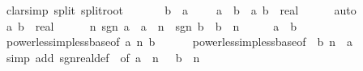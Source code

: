 \begin{isabellebody}
%
\isadelimproof
%
\endisadelimproof
%
\isatagproof
{}\isamarkupfalse%
\ {\isacharparenleft}{\kern0pt}clarsimp\ split{\isacharcolon}{\kern0pt}\ split{\isacharunderscore}{\kern0pt}root{\isacharparenright}{\kern0pt}\isanewline
\ \ \isamarkupfalse%
\ {\isacharasterisk}{\kern0pt}{\isacharcolon}{\kern0pt}\ {\isachardoublequoteopen}{}\ {\isacharless}{\kern0pt}\ b\ {\isasymLongrightarrow}\ a\ {\isacharless}{\kern0pt}\ {}\ {\isasymLongrightarrow}\ {\isasymnot}\ a\ {\isachargreater}{\kern0pt}\ b{\isachardoublequoteclose}\ \ a\ b\ {\isacharcolon}{\kern0pt}{\isacharcolon}{\kern0pt}\ real\isanewline
\ \ \ \ \isamarkupfalse%
\ auto\isanewline
\ \ \isamarkupfalse%
\ a\ b\ {\isacharcolon}{\kern0pt}{\isacharcolon}{\kern0pt}\ real\isanewline
\ \ \isamarkupfalse%
\ {\isachardoublequoteopen}{}\ {\isacharless}{\kern0pt}\ n{\isachardoublequoteclose}\ {\isachardoublequoteopen}sgn\ a\ {\isacharasterisk}{\kern0pt}\ {\isasymbar}a{\isasymbar}\ {\isacharcircum}{\kern0pt}\ n\ {\isacharless}{\kern0pt}\ sgn\ b\ {\isacharasterisk}{\kern0pt}\ {\isasymbar}b{\isasymbar}\ {\isacharcircum}{\kern0pt}\ n{\isachardoublequoteclose}\isanewline
\ \ \isamarkupfalse%
\ \isamarkupfalse%
\ {\isachardoublequoteopen}a\ {\isacharless}{\kern0pt}\ b{\isachardoublequoteclose}\isanewline
\ \ \ \ \isamarkupfalse%
\ power{\isacharunderscore}{\kern0pt}less{\isacharunderscore}{\kern0pt}imp{\isacharunderscore}{\kern0pt}less{\isacharunderscore}{\kern0pt}base{\isacharbrackleft}{\kern0pt}of\ a\ n\ b{\isacharbrackright}{\kern0pt}\isanewline
\ \ \ \ \ \ power{\isacharunderscore}{\kern0pt}less{\isacharunderscore}{\kern0pt}imp{\isacharunderscore}{\kern0pt}less{\isacharunderscore}{\kern0pt}base{\isacharbrackleft}{\kern0pt}of\ {\isachardoublequoteopen}{\isacharminus}{\kern0pt}\ b{\isachardoublequoteclose}\ n\ {\isachardoublequoteopen}{\isacharminus}{\kern0pt}\ a{\isachardoublequoteclose}{\isacharbrackright}{\kern0pt}\isanewline
\ \ \ \ \isamarkupfalse%
\ {\isacharparenleft}{\kern0pt}simp\ add{\isacharcolon}{\kern0pt}\ sgn{\isacharunderscore}{\kern0pt}real{\isacharunderscore}{\kern0pt}def\ {\isacharasterisk}{\kern0pt}\ {\isacharbrackleft}{\kern0pt}of\ {\isachardoublequoteopen}a\ {\isacharcircum}{\kern0pt}\ n{\isachardoublequoteclose}\ {\isachardoublequoteopen}{\isacharminus}{\kern0pt}\ {\isacharparenleft}{\kern0pt}{\isacharparenleft}{\kern0pt}{\isacharminus}{\kern0pt}\ b{\isacharparenright}{\kern0pt}\ {\isacharcircum}{\kern0pt}\ n{\isacharparenright}{\kern0pt}{\isachardoublequoteclose}{\isacharbrackright}{\kern0pt}\isanewline

\end{isabellebody}
